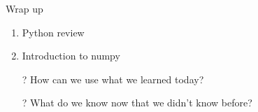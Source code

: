 \documentclass[aspectratio=169]{beamer}
\newenvironment{noindentitemize}
{ \begin{itemize}
 \setlength{\itemsep}{1.5ex}
  \setlength{\parsep}{0pt}   
  \setlength{\parskip}{0pt}
 \addtolength{\leftskip}{-2em}
 }
{ \end{itemize} }
\newenvironment{noindentitemize2}
{ \begin{itemize}
  \setlength{\itemsep}{0ex}
  \setlength{\parskip}{0pt}
  \setlength{\parsep}{0pt}   
  \addtolength{\leftskip}{-2em}  }
{ \end{itemize} }
\begin{document}
%
%
%
%


\begin{frame}{Wrap up}
\begin{enumerate}
\item Python review
\item Introduction to numpy
\end{enumerate}

\begin{itemize}
	\item[?] How can we use what we learned today?
	\vspace{2em}
	\item[?] What do we know now that we didn't know before?
\end{itemize}


\end{frame}
\end{document}
